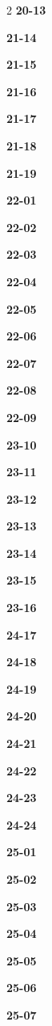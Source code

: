 \documentclass[10pt,a4paper]{article}
\begin{document}
\begin{multicols}{2}
\noindent\textbf{20-13}\ \par
\noindent\textbf{21-14}\ \par
\noindent\textbf{21-15}\ \par
\noindent\textbf{21-16}\ \par
\noindent\textbf{21-17}\ \par
\noindent\textbf{21-18}\ \par
\noindent\textbf{21-19}\ \par
\noindent\textbf{22-01}\ \par
\noindent\textbf{22-02}\ \par
\noindent\textbf{22-03}\ \par
\noindent\textbf{22-04}\ \par
\noindent\textbf{22-05}\ \par
\noindent\textbf{22-06}\ \par
\noindent\textbf{22-07}\ \par
\noindent\textbf{22-08}\ \par
\noindent\textbf{22-09}\ \par
\noindent\textbf{23-10}\ \par
\noindent\textbf{23-11}\ \par
\noindent\textbf{23-12}\ \par
\noindent\textbf{23-13}\ \par
\noindent\textbf{23-14}\ \par
\noindent\textbf{23-15}\ \par
\noindent\textbf{23-16}\ \par
\noindent\textbf{24-17}\ \par
\noindent\textbf{24-18}\ \par
\noindent\textbf{24-19}\ \par
\noindent\textbf{24-20}\ \par
\noindent\textbf{24-21}\ \par
\noindent\textbf{24-22}\ \par
\noindent\textbf{24-23}\ \par
\noindent\textbf{24-24}\ \par
\noindent\textbf{25-01}\ \par
\noindent\textbf{25-02}\ \par
\noindent\textbf{25-03}\ \par
\noindent\textbf{25-04}\ \par
\noindent\textbf{25-05}\ \par
\noindent\textbf{25-06}\ \par
\noindent\textbf{25-07}\ \par

\end{multicols}
\end{document}
